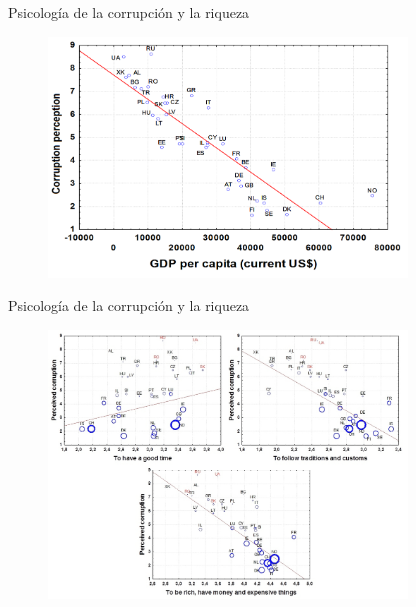 \documentclass{beamer}
\begin{document}
\begin{frame}{Psicología de la corrupción y la riqueza}
\begin{figure}
\centering
 \includegraphics[width=0.85\textwidth]{F1}
 \end{figure}
\end{frame}

\begin{frame}{Psicología de la corrupción y la riqueza}
\begin{figure}
\centering
 \includegraphics[width=0.85\textwidth]{F2}
 \end{figure}
\end{frame}
\end{document}
